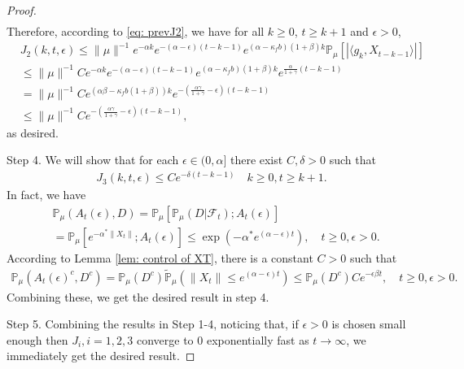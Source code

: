 \documentclass[12pt]{amsart}
\theoremstyle{plain}
\theoremstyle{definition}
\numberwithin{equation}{section}
\begin{document}
\begin{proof}
\begin{align}
\end{align}
Therefore, according to \eqref{eq: prevJ2}, we have for all $k\geq 0$, $t\geq k+1$ and $\epsilon> 0$,
\begin{align}
	&J_2(k,t,\epsilon)
	\leq  \|\mu\|^{-1}e^{-\alpha k}e^{-(\alpha-\epsilon)(t-k-1)}e^{(\alpha-\kappa_f b)(1+\beta)k} \mathbb{P}_{\mu}\left[\left|\langle g_k,X_{t-k-1}\rangle\right|\right]
	\\&\leq \|\mu\|^{-1}C e^{-\alpha k}e^{-(\alpha-\epsilon)(t-k-1)}e^{(\alpha-\kappa_f b)(1+\beta)k} e^{\frac{\alpha}{1+\gamma}(t-k-1)}
	\\&= \|\mu\|^{-1}C e^{(\alpha \beta - \kappa_f b(1+\beta))k}e^{-(\frac{\alpha\gamma}{1+\gamma}-\epsilon)(t-k-1)}
	\\&\leq \|\mu\|^{-1}C e^{-(\frac{\alpha\gamma}{1+\gamma}-\epsilon)(t-k-1)},
\end{align}
	as desired.

	Step 4. We will show that for each $\epsilon\in (0,  \alpha]$ there exist $C,\delta>0$ such that
\begin{align}\label{ineq: control of J3}
    J_3(k,t,\epsilon)\leq Ce^{-\delta (t-k-1)}\quad k\geq0, t\geq k+1.
\end{align}
	In fact, we have
\begin{align}
	&\mathbb P_{\mu}(A_{t}(\epsilon), D) = \mathbb P_{\mu}[\mathbb P_{\mu}(D|\mathscr F_t);A_t(\epsilon)]
	\\&= \mathbb P_\mu[e^{-\alpha^*\|X_t\|};A_t(\epsilon)]
	\leq \exp({-\alpha^* e^{(\alpha - \epsilon)t}}),\quad t\geq 0, \epsilon >0.
\end{align}
According to Lemma \ref{lem: control of XT}, there is a constant $C>0$ such that
\begin{align}
	\mathbb P_\mu(A_t(\epsilon)^c,D^c) = \mathbb P_\mu(D^c) \tilde{\mathbb P}_\mu(\|X_t\|\leq e^{(\alpha - \epsilon) t}) \leq \mathbb P_\mu(D^c)C e^{-\epsilon \beta t},\quad t\geq 0, \epsilon >0.
\end{align}
	Combining these, we get the desired result in step 4.

	Step 5.  Combining the results in Step 1-4, noticing that, if $\epsilon>0$ is chosen small enough then $J_{i}, i = 1,2,3$ converge to $0$ exponentially fast as $t\rightarrow\infty$, 
we immediately get the desired result.
\end{proof}
\end{document}
